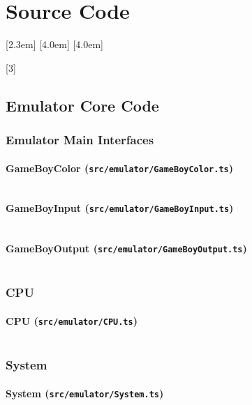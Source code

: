 

\newcommand{\src}[4]{
\subsubsection{#2 (\texttt{#1/#2.#3})}
\inputminted{#4}{../#1/#2.#3}
\clearpage
}

\newcommand{\srcTs}[2]{\src{#1}{#2}{ts}{typescript}}
\newcommand{\srcTsx}[2]{\src{#1}{#2}{tsx}{jsx}}
\newcommand{\srcCss}[2]{\src{#1}{#2}{css}{css}}

\chapter{Source Code}

\hypersetup{linkcolor=black}
[2.3em]
{} {\contentslabel{2.3em}} {} {\contentspage}
[4.0em]
{} {\contentslabel{3.2em}} {} {\contentspage}
[4.0em]
{\small} {} {} {\contentspage}


\startcontents[sourcecode]
[3]{}

\clearpage

\section{Emulator Core Code}

\subsection{Emulator Main Interfaces}

\srcTs{src/emulator}{GameBoyColor}
\srcTs{src/emulator}{GameBoyInput}
\srcTs{src/emulator}{GameBoyOutput}

\subsection{CPU}

\srcTs{src/emulator}{CPU}

\subsection{System}

\srcTs{src/emulator}{System}

